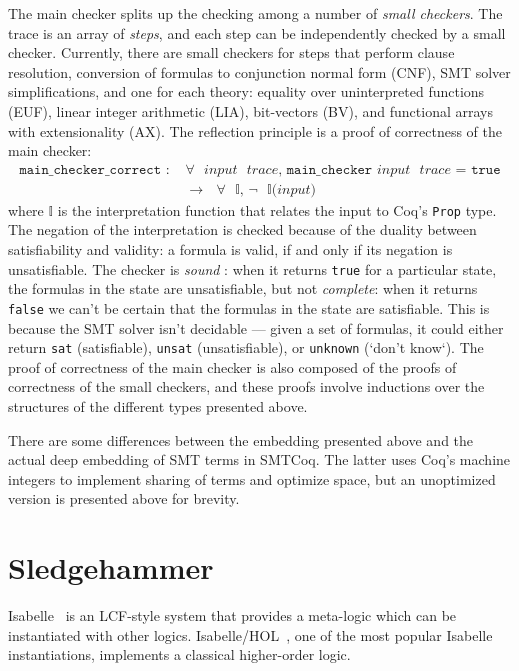 \documentclass{article}
\begin{document}
	The main checker splits up the 
	checking among a number of 
	\textit{small checkers}. The 
	trace is an array of \textit{steps}, 
	and each step can be independently 
	checked by a small checker. Currently, 
	there are small checkers for steps 
	that perform clause resolution, 
	conversion of formulas to conjunction 
	normal form (CNF), SMT solver 
	simplifications, and one for each 
	theory:	equality over uninterpreted 
	functions (EUF), linear integer 
	arithmetic (LIA), bit-vectors (BV), 
	and functional arrays with 
	extensionality (AX). The reflection 
	principle is a proof of correctness 
	of the main checker:
	\begin{align*}
		\texttt{main\_checker\_correct
		: } &\texttt{$\forall$ $input$ 
		$trace$, main\_checker $input$ 
		$trace$ = true}\\
		&\texttt{$\to$ $\forall$ 
		$\mathbb{I}$, $\neg$ 
		$\mathbb{I}$($input$)}
	\end{align*}
	where $\mathbb{I}$ is the 
	interpretation function that 
	relates the input to Coq's 
	\texttt{Prop} type. The negation of 
	the interpretation is checked because 
	of the duality between satisfiability 
	and validity: a formula is valid, if 
	and only if its negation is 
	unsatisfiable. The checker is 
	\textit{sound} : when it returns 
	\texttt{true} for a particular state, 
	the formulas in the state are 
	unsatisfiable, but not 
	\textit{complete}: when it returns 
	\texttt{false} we can't be certain 
	that the formulas in the state are 
	satisfiable. This is because the 
	SMT solver isn't decidable --- given 
	a set of formulas, it could either 
	return \texttt{sat} (satisfiable), 
	\texttt{unsat} (unsatisfiable), or 
	\texttt{unknown} (`don't know`).
	The proof of correctness of the main 
	checker is also composed of the 
	proofs of correctness of the small 
	checkers, and these proofs involve 
	inductions over the structures of 
	the different types presented 
	above. 
	
	There are some differences between
	the embedding presented above 
	and the actual deep embedding 
	of SMT terms in SMTCoq. The 
	latter uses Coq's machine 
	integers to implement sharing 
	of terms and optimize space, 
	but an unoptimized version is 
	presented above for brevity.

	
\section{Sledgehammer}
\label{sec:hammer}
	Isabelle~\cite{DBLP:journals/corr/cs-LO-9301106} 
	is an LCF-style system that 
	provides a meta-logic which can be 
	instantiated with other logics.
	Isabelle/HOL~\cite{10.5555/1791547}, 
	one of the most popular Isabelle 
	instantiations, implements a 
	classical higher-order logic. 
	
\end{document}
